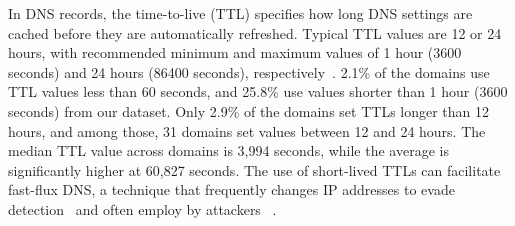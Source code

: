 In DNS records, the time-to-live (TTL) specifies how long DNS settings are cached before they are automatically refreshed. Typical TTL values are 12 or 24 hours, with recommended minimum and maximum values of 1 hour (3600 seconds) and 24 hours (86400 seconds), respectively~\cite{DNSTTLbe81:online}. 
2.1\% of the domains use TTL values less than 60 seconds, and 25.8\% use values shorter than 1 hour (3600 seconds) from our dataset. 
Only 2.9\% of the domains set TTLs longer than 12 hours, and among those, 31 domains set values between 12 and 24 hours. 
The median TTL value across domains is 3,994 seconds, while the average is significantly higher at 60,827 seconds. The use of short-lived TTLs can facilitate fast-flux DNS, a technique that frequently changes IP addresses to evade detection~\cite{bilge2011exposure,galloway2024practical} and often employ by
attackers ~\cite{dagon2008corrupted}.




